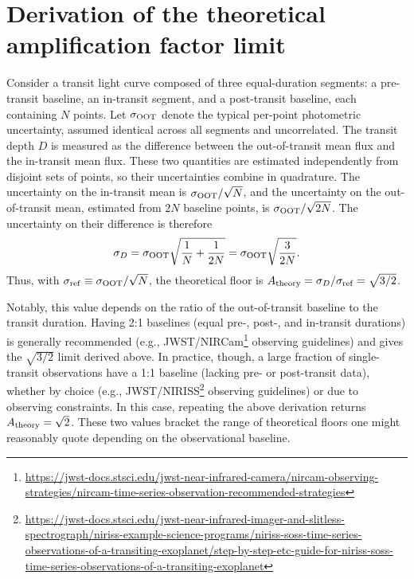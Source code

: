 \documentclass[twocolumn]{aastex631}
\newcommand{\vtwo}[1]{{#1}}
\begin{document}
\restartappendixnumbering
\renewcommand{\theHfigure}{appendix.\thefigure}
\renewcommand{\theHtable}{appendix.\thetable}

\section{Derivation of the theoretical amplification factor limit}\label{sec:appendix_sqrt}
Consider a transit light curve composed of three equal\vtwo{-}duration segments: a pre-transit baseline, an in-transit segment, and a post-transit baseline, each containing $N$ points. Let $\sigma_{\rm OOT}$ denote the typical per-point photometric uncertainty, assumed identical across all segments and uncorrelated.
The transit depth $D$ is measured as the difference between the out-of-transit mean flux and the in-transit mean flux. These two quantities are estimated independently from disjoint sets of points, so their uncertainties combine in quadrature. The uncertainty on the in-transit mean is $\sigma_{\rm OOT}/\sqrt{N}$, and the uncertainty on the out-of-transit mean, estimated from $2N$ baseline points, is $\sigma_{\rm OOT}/\sqrt{2N}$. The uncertainty on their difference is therefore
\begin{equation}
    \sigma_D = \sigma_{\rm OOT}\sqrt{\frac{1}{N} + \frac{1}{2N}} = \sigma_{\rm OOT}\sqrt{\frac{3}{2N}}.
\end{equation}
\vtwo{Thus}, with $\sigma_{\rm ref} \equiv \sigma_{\rm OOT}/\sqrt{N}$, the theoretical floor is $A_{\rm theory} = \sigma_D/\sigma_{\rm ref} = \sqrt{3/2}$. 

\vtwo{Notably, this value depends on the ratio of the out-of-transit baseline to the transit duration. Having 2:1 baselines (equal pre-, post-, and in-transit durations) is generally recommended (e.g., JWST/NIRCam\footnote{\url{https://jwst-docs.stsci.edu/jwst-near-infrared-camera/nircam-observing-strategies/nircam-time-series-observation-recommended-strategies}} observing guidelines) and gives the $\sqrt{3/2}$ limit derived above. In practice, though, a large fraction of single-transit observations have a 1:1 baseline (lacking pre- or post-transit data), whether by choice (e.g., JWST/NIRISS\footnote{\url{https://jwst-docs.stsci.edu/jwst-near-infrared-imager-and-slitless-spectrograph/niriss-example-science-programs/niriss-soss-time-series-observations-of-a-transiting-exoplanet/step-by-step-etc-guide-for-niriss-soss-time-series-observations-of-a-transiting-exoplanet}} observing guidelines) or due to observing constraints. In this case, repeating the above derivation returns $A_{\rm theory} = \sqrt{2}$. These two values bracket the range of theoretical floors one might reasonably quote depending on the observational baseline.}
\end{document}
